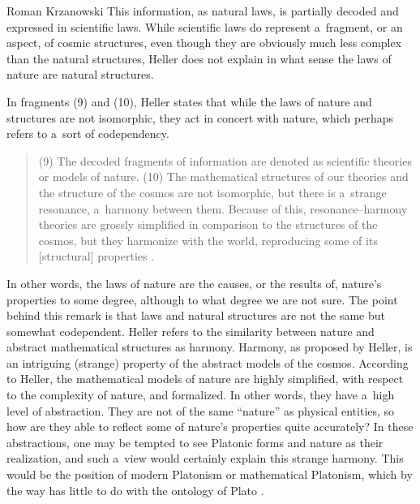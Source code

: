 \begin{artengenv}{Roman Krzanowski}
This information, as natural laws, is partially decoded and expressed in scientific laws. While scientific laws do represent a~fragment, or an aspect, of cosmic structures, even though they are obviously much less complex than the natural structures, Heller does not explain in what sense the laws of nature are natural structures.



In fragments (9) and (10), Heller states that while the laws of nature and structures are not isomorphic, they act in concert with nature, which perhaps refers to a~sort of codependency.



\begin{quote}
(9) The decoded fragments of information are denoted as scientific theories or models of nature. (10) The mathematical structures of our theories and the structure of the cosmos are not isomorphic, but there is a~strange resonance, a~harmony between them. Because of this, resonance–harmony theories are grossly simplified in comparison to the structures of the cosmos, but they harmonize with the world, reproducing some of its [structural] properties 
\parencite[][p.170]{heller_nauka_1995}.%
\end{quote}




In other words, the laws of nature are the causes, or the results of, nature's properties to some degree, although to what degree we are not sure. The point behind this remark is that laws and natural structures are not the same but somewhat codependent. Heller refers to the similarity between nature and abstract mathematical structures as harmony. Harmony, as proposed by Heller, is an intriguing (strange) property of the abstract models of the cosmos. According to Heller, the mathematical models of nature are highly simplified, with respect to the complexity of nature, and formalized. In other words, they have a~high level of abstraction. They are not of the same ``nature'' as physical entities, so how are they able to reflect some of nature's properties quite accurately? In these abstractions, one may be tempted to see Platonic forms and nature as their realization, and such a~view would certainly explain this strange harmony. This would be the position of modern Platonism or mathematical Platonism, which by the way has little to do with the ontology of Plato 
\parencite[e.g][]{linnebo_platonism_2018}.%





\end{artengenv}
